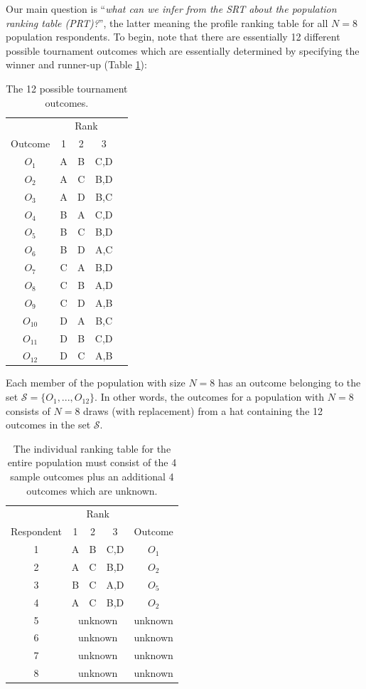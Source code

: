 \documentclass[a4paper, 12pt]{article}
\begin{document}
Our main question is ``\emph{what can we infer from the SRT about the population ranking table (PRT)?}'', the latter meaning the profile ranking table for all $N=8$ population respondents. To begin,  note that there are essentially 12 different possible tournament outcomes which are essentially determined by specifying the winner and runner-up (Table \ref{Tab3}):

\begin{table}[!htpb]
\scriptsize
\centering
\begin{tabular}{c|cccc}
&\multicolumn{3}{c}{Rank}&\\
Outcome& 1 & 2 & 3\\\hline
$O_1$& A&B&C,D\\
$O_2$& A &C&B,D \\
$O_3$& A&D&B,C\\
$O_4$& B&A&C,D\\
$O_5$& B &C&B,D\\
$O_6$& B&D&A,C\\
$O_7$& C&A&B,D\\
$O_8$& C &B&A,D\\
$O_9$& C&D&A,B\\
$O_{10}$& D&A&B,C\\
$O_{11}$& D&B&C,D\\
$O_{12}$& D&C&A,B\\
\end{tabular}
\caption{The 12 possible tournament outcomes.}
\label{Tab3}
\end{table}



{\flushleft Each} member of the population with size $N=8$ has an outcome belonging to the set $\mathcal{S}=\{O_1,...,O_{12}\}$. In other words, the  outcomes for a population with $N=8$ consists of $N=8$ draws (with replacement) from a hat containing the 12 outcomes in the set $\mathcal{S}$.
\begin{table}[!htpb]\centering
\scriptsize
\begin{tabular}{c|ccc|c}
&\multicolumn{3}{c}{Rank}&\\
Respondent& 1 & 2 & 3&Outcome\\\hline
1& A&B&C,D&$O_1$\\
2& A &C&B,D&$O_2$ \\
3& B &C&A,D & $O_5$\\
4& A &C&B,D & $O_2$\\\hline
5 & \multicolumn{3}{c|}{unknown}&unknown\\
6&  \multicolumn{3}{c|}{unknown}&unknown\\
7&  \multicolumn{3}{c|}{unknown}&unknown\\
8&  \multicolumn{3}{c|}{unknown}&unknown\\
\end{tabular}
\caption{{\small The individual ranking table for the entire population must consist of the 4 sample outcomes plus an additional  4 outcomes which are unknown.}}
\label{Tab4}
\end{table}
\end{document}
